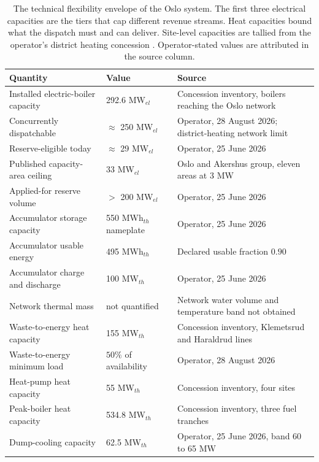\begin{table}[h]
\centering
\caption{The technical flexibility envelope of the Oslo system. The first three electrical capacities are the tiers that cap different revenue streams. Heat capacities bound what the dispatch must and can deliver. Site-level capacities are tallied from the operator's district heating concession \cite{nve_konsesjonssak_2026}. Operator-stated values are attributed in the source column.}
\small
\begin{tabular}{p{4.6cm} p{2.6cm} p{7.2cm}}
\toprule
\textbf{Quantity} & \textbf{Value} & \textbf{Source} \\
\midrule
Installed electric-boiler capacity & 292.6 MW$_{el}$ & Concession inventory, boilers reaching the Oslo network \\
Concurrently dispatchable & $\approx$ 250 MW$_{el}$ & Operator, 28 August 2026; district-heating network limit \\
Reserve-eligible today & $\approx$ 29 MW$_{el}$ & Operator, 25 June 2026 \\
Published capacity-area ceiling & 33 MW$_{el}$ & Oslo and Akershus group, eleven areas at 3 MW \cite{statnett_innforing_2026} \\
Applied-for reserve volume & $>$ 200 MW$_{el}$ & Operator, 25 June 2026 \\
\addlinespace
Accumulator storage capacity & 550 MWh$_{th}$ nameplate & Operator, 25 June 2026 \\
Accumulator usable energy & 495 MWh$_{th}$ & Declared usable fraction $0.90$ \\
Accumulator charge and discharge & 100 MW$_{th}$ & Operator, 25 June 2026 \\
Network thermal mass & not quantified & Network water volume and temperature band not obtained \\
\addlinespace
Waste-to-energy heat capacity & 155 MW$_{th}$ & Concession inventory, Klemetsrud and Haraldrud lines \\
Waste-to-energy minimum load & $50\%$ of availability & Operator, 28 August 2026 \\
Heat-pump heat capacity & 55 MW$_{th}$ & Concession inventory, four sites \\
Peak-boiler heat capacity & 534.8 MW$_{th}$ & Concession inventory, three fuel tranches \\
Dump-cooling capacity & 62.5 MW$_{th}$ & Operator, 25 June 2026, band 60 to 65 MW \\
\bottomrule
\end{tabular}
\label{tab:3.3 technical envelope}
\end{table}

